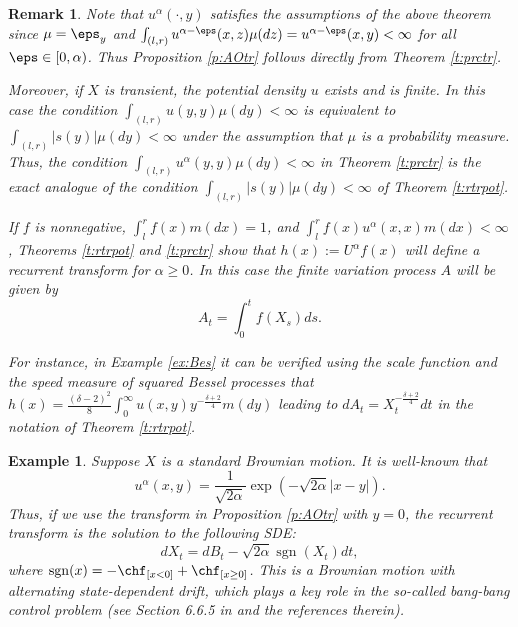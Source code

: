 \documentclass[11pt,reqno]{amsart}
\numberwithin{equation}{section}
\newtheorem{example}{Example}[section]
\newtheorem{remark}{Remark}[section]
\DeclareMathOperator{\sgn}{sgn}
\begin{document}
\begin{remark}
	Note that $u^{\alpha}(\cdot,y)$ satisfies the assumptions of the above theorem since $\mu=\eps_y$ and $\int_{(l,r)} u^{\alpha-\eps}(x,z)\mu(dz)=u^{\alpha-\eps}(x,y)<\infty$ for all $\eps\in [0,\alpha)$. Thus Proposition \ref{p:AOtr} follows directly from Theorem \ref{t:prctr}.
	
	 Moreover, if $X$ is transient, the potential density $u$ exists and is finite.  In this case the condition $\int_{(l,r)} u(y,y)\mu(dy)<\infty$ is equivalent to $\int_{(l,r)} |s(y)|\mu(dy)<\infty$ under the assumption that $\mu$ is a probability measure. Thus,   the condition $\int_{(l,r)} u^{\alpha}(y,y)\mu(dy)<\infty$ in Theorem \ref{t:prctr} is the exact analogue of the condition $\int_{(l,r)} |s(y)|\mu(dy)<\infty$ of Theorem \ref{t:rtrpot}.
	 
	 If $f$ is nonnegative, $\int_l^r f(x)m(dx)=1$, and $\int_l^r f(x)u^{\alpha}(x,x)m(dx)<\infty$,  Theorems \ref{t:rtrpot} and \ref{t:prctr} show that $h(x):=U^{\alpha}f(x)$ will define a recurrent transform for $\alpha\geq 0$. In this case the finite variation process $A$ will be given by
	\[
	A_t=\int_0^t f(X_s)ds.
	\]	
	
	For instance, in  Example \ref{ex:Bes} it can be verified using the scale function and the speed measure of squared Bessel processes that $h(x)=\frac{(\delta-2)^2}{8}\int_0^{\infty}u(x,y)y^{-\frac{\delta +2}{4}}m(dy)$ leading to $dA_t=X_t^{-\frac{\delta +2}{4}}dt$ in the notation of Theorem \ref{t:rtrpot}.
\end{remark}
\begin{example} \label{ex:BMalt} Suppose $X$ is a standard Brownian motion. It is well-known that
\[
u^{\alpha}(x,y)=\frac{1}{\sqrt{2 \alpha}}\exp\left(-\sqrt{2 \alpha}|x-y|\right).
\]
Thus, if we use  the transform in Proposition \ref{p:AOtr} with $y=0$, the recurrent transform is the solution to the following SDE:
\[
dX_t= dB_t -\sqrt{2 \alpha}\sgn(X_t)dt,
\]
where $\sgn(x)=-\chf_{[x<0]}+\chf_{[x\geq 0]}$. This is a Brownian motion with alternating state-dependent drift, which plays a key role in the so-called {\em bang-bang} control problem (see Section 6.6.5 in \cite{KS} and the references therein).
\end{example}
\end{document}
